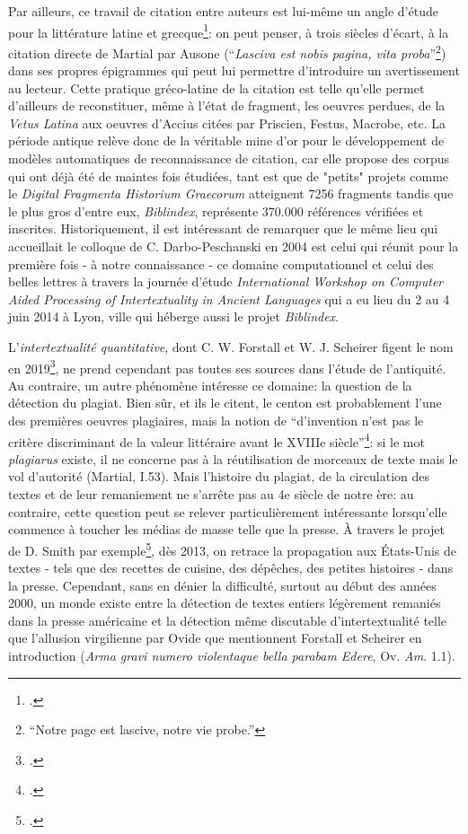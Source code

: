 Par ailleurs, ce travail de citation entre auteurs est lui-même un angle d'étude pour la littérature latine et grecque\footcite{darbo-peschanski_citation_2004}: on peut penser, à trois siècles d'écart, à la citation directe de Martial par Ausone (\enquote{\textit{Lasciva est nobis pagina, vita proba}}\footnote{\enquote{Notre page est lascive, notre vie probe.}}) dans ses propres épigrammes qui peut lui permettre d'introduire un avertissement au lecteur. Cette pratique gréco-latine de la citation est telle qu'elle permet d'ailleurs de reconstituer, même à l'état de fragment, les oeuvres perdues, de la \textit{Vetus Latina} aux oeuvres d'Accius citées par Priscien, Festus, Macrobe, etc. La période antique relève donc de la véritable mine d'or pour le développement de modèles automatiques de reconnaissance de citation, car elle propose des corpus qui ont déjà été de maintes fois étudiées, tant est que de "petits" projets comme le \textit{Digital Fragmenta Historium Graecorum} atteignent 7256 fragments tandis que le plus gros d'entre eux, \textit{Biblindex}, représente 370.000 références vérifiées et inscrites. Historiquement, il est intéressant de remarquer que le même lieu qui accueillait le colloque de C.  Darbo-Peschanski en 2004 est celui qui réunit pour la première fois - à notre connaissance - ce domaine computationnel et celui des belles lettres à travers la journée d'étude \textit{International Workshop on Computer Aided Processing of Intertextuality in Ancient Languages} qui a eu lieu du 2 au 4 juin 2014 à Lyon, ville qui héberge aussi le projet \textit{Biblindex}.

L'\textit{intertextualité quantitative}, dont C. W. Forstall et W. J. Scheirer figent le nom en 2019\footcite{forstall_quantitative_2019}, ne prend cependant pas toutes ses sources dans l'étude de l'antiquité. Au contraire, un autre phénomène intéresse ce domaine: la question de la détection du plagiat. Bien sûr, et ils le citent, le centon est probablement l'une des premières oeuvres plagiaires, mais la notion de \enquote{d'invention n'est pas le critère discriminant de la valeur littéraire avant le XVIIIe siècle}\footcite{aron_plagiat_2010}: si le mot \textit{plagiarus} existe, il ne concerne pas à la réutilisation de morceaux de texte mais le vol d'autorité (Martial, I.53). Mais l'histoire du plagiat, de la circulation des textes et de leur remaniement ne s'arrête pas au 4e siècle de notre ère: au contraire, cette question peut se relever particulièrement intéressante lorsqu'elle commence à toucher les médias de masse telle que la presse. À travers le projet de D. Smith par exemple\footcite{smith_computational_2015, smith_infectious_2013}, dès 2013, on retrace la propagation aux États-Unis de textes - tels que des recettes de cuisine, des dépêches, des petites histoires - dans la presse. Cependant, sans en dénier la difficulté, surtout au début des années 2000, un monde existe entre la détection de textes entiers légèrement remaniés dans la presse américaine et la détection même discutable d'intertextualité telle que l'allusion virgilienne par Ovide que mentionnent Forstall et Scheirer en introduction (\textit{Arma gravi numero violentaque bella parabam Edere}, Ov. \textit{Am}. 1.1). 


